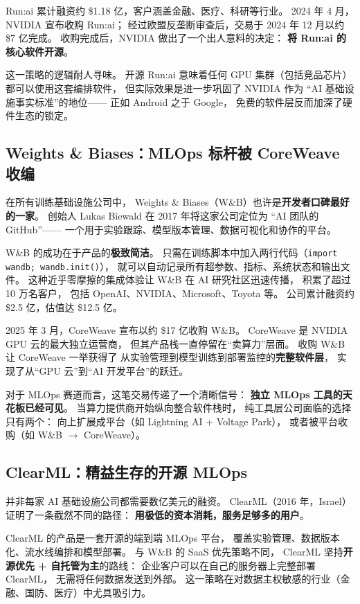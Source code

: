Run:ai 累计融资约 \$1.18 亿，客户涵盖金融、医疗、科研等行业。
2024 年 4 月，NVIDIA 宣布收购 Run:ai；
经过欧盟反垄断审查后，交易于 2024 年 12 月以约 \$7 亿完成。
收购完成后，NVIDIA 做出了一个出人意料的决定：
\textbf{将 Run:ai 的核心软件开源}。

这一策略的逻辑耐人寻味。
开源 Run:ai 意味着任何 GPU 集群（包括竞品芯片）
都可以使用这套编排软件，
但实际效果是进一步巩固了 NVIDIA 作为
``AI 基础设施事实标准''的地位——
正如 Android 之于 Google，
免费的软件层反而加深了硬件生态的锁定。


\subsection{Weights \& Biases：MLOps 标杆被 CoreWeave 收编}

在所有训练基础设施公司中，
Weights \& Biases（W\&B）也许是\textbf{开发者口碑最好的一家}。
创始人 Lukas Biewald 在 2017 年将这家公司定位为
``AI 团队的 GitHub''——
一个用于实验跟踪、模型版本管理、数据可视化和协作的平台。

W\&B 的成功在于产品的\textbf{极致简洁}。
只需在训练脚本中加入两行代码（\texttt{import wandb; wandb.init()}），
就可以自动记录所有超参数、指标、系统状态和输出文件。
这种近乎零摩擦的集成体验让 W\&B 在 AI 研究社区迅速传播，
积累了超过 10 万名客户，
包括 OpenAI、NVIDIA、Microsoft、Toyota 等。
公司累计融资约 \$2.5 亿，估值达 \$12.5 亿。

2025 年 3 月，CoreWeave 宣布以约 \$17 亿收购 W\&B。
CoreWeave 是 NVIDIA GPU 云的最大独立运营商，
但其产品栈一直停留在``卖算力''层面。
收购 W\&B 让 CoreWeave 一举获得了
从实验管理到模型训练到部署监控的\textbf{完整软件层}，
实现了从``GPU 云''到``AI 开发平台''的跃迁。

对于 MLOps 赛道而言，这笔交易传递了一个清晰信号：
\textbf{独立 MLOps 工具的天花板已经可见}。
当算力提供商开始纵向整合软件栈时，
纯工具层公司面临的选择只有两个：
向上扩展成平台（如 Lightning AI + Voltage Park），
或者被平台收购（如 W\&B $\to$ CoreWeave）。


\subsection{ClearML：精益生存的开源 MLOps}

并非每家 AI 基础设施公司都需要数亿美元的融资。
ClearML（2016 年，Israel）证明了一条截然不同的路径：
\textbf{用极低的资本消耗，服务足够多的用户}。

ClearML 的产品是一套开源的端到端 MLOps 平台，
覆盖实验管理、数据版本化、流水线编排和模型部署。
与 W\&B 的 SaaS 优先策略不同，
ClearML 坚持\textbf{开源优先 + 自托管为主}的路线：
企业客户可以在自己的服务器上完整部署 ClearML，
无需将任何数据发送到外部。
这一策略在对数据主权敏感的行业（金融、国防、医疗）中尤具吸引力。

